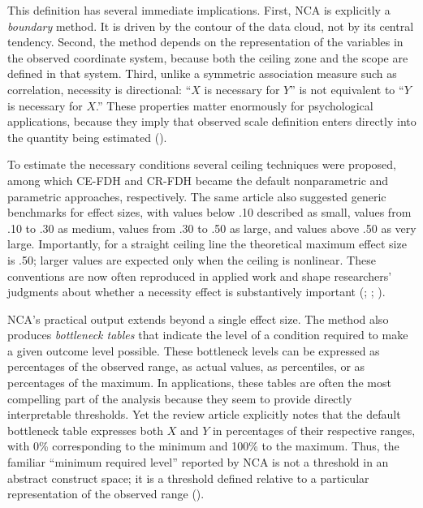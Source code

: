 \documentclass[
  man,
  longtable,
  nolmodern,
  notxfonts,
  notimes,
  colorlinks=true,linkcolor=blue,citecolor=blue,urlcolor=blue]{apa7}
\begin{document}
This definition has several immediate implications. First, NCA is
explicitly a \emph{boundary} method. It is driven by the contour of the
data cloud, not by its central tendency. Second, the method depends on
the representation of the variables in the observed coordinate system,
because both the ceiling zone and the scope are defined in that system.
Third, unlike a symmetric association measure such as correlation,
necessity is directional: ``\(X\) is necessary for \(Y\)'' is not
equivalent to ``\(Y\) is necessary for \(X\).'' These properties matter
enormously for psychological applications, because they imply that
observed scale definition enters directly into the quantity being
estimated ().

To estimate the necessary conditions several ceiling techniques were
proposed, among which CE-FDH and CR-FDH became the default nonparametric
and parametric approaches, respectively. The same article also suggested
generic benchmarks for effect sizes, with values below .10 described as
small, values from .10 to .30 as medium, values from .30 to .50 as
large, and values above .50 as very large. Importantly, for a straight
ceiling line the theoretical maximum effect size is .50; larger values
are expected only when the ceiling is nonlinear. These conventions are
now often reproduced in applied work and shape researchers' judgments
about whether a necessity effect is substantively important
(;
;
).

NCA's practical output extends beyond a single effect size. The method
also produces \emph{bottleneck tables} that indicate the level of a
condition required to make a given outcome level possible. These
bottleneck levels can be expressed as percentages of the observed range,
as actual values, as percentiles, or as percentages of the maximum. In
applications, these tables are often the most compelling part of the
analysis because they seem to provide directly interpretable thresholds.
Yet the review article explicitly notes that the default bottleneck
table expresses both \(X\) and \(Y\) in percentages of their respective
ranges, with 0\% corresponding to the minimum and 100\% to the maximum.
Thus, the familiar ``minimum required level'' reported by NCA is not a
threshold in an abstract construct space; it is a threshold defined
relative to a particular representation of the observed range
().
\end{document}

